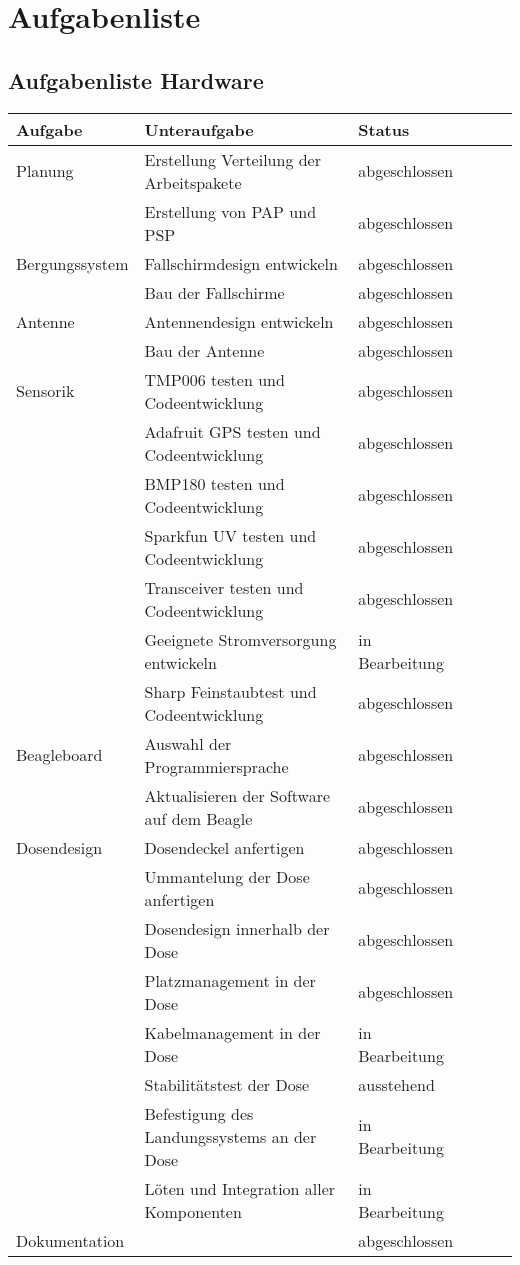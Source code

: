 \section{Aufgabenliste}

\subsection{Aufgabenliste Hardware}
\begin{table}[H]
  \centering
    \begin{tabular}{p{3cm}p{7cm}p{3cm}rrr}
    \toprule
    \textbf{Aufgabe} & \textbf{Unteraufgabe} & \textbf{Status} \\
    \midrule
	Planung & Erstellung Verteilung der Arbeitspakete & abgeschlossen \\
	& Erstellung von PAP und PSP & abgeschlossen \\
	\midrule
	Bergungssystem & Fallschirmdesign entwickeln & abgeschlossen\\
	& Bau der Fallschirme & abgeschlossen\\
	\midrule
	Antenne & Antennendesign entwickeln & abgeschlossen \\
	& Bau der Antenne & abgeschlossen \\
	\midrule
	Sensorik & TMP006 testen und Codeentwicklung & abgeschlossen\\
	& Adafruit GPS testen und Codeentwicklung & abgeschlossen\\
	& BMP180 testen und Codeentwicklung & abgeschlossen\\
	& Sparkfun UV testen und Codeentwicklung & abgeschlossen\\
	& Transceiver testen und Codeentwicklung & abgeschlossen\\
	& Geeignete Stromversorgung entwickeln & in Bearbeitung\\
	& Sharp Feinstaubtest und Codeentwicklung & abgeschlossen\\
	\midrule
	Beagleboard & Auswahl der Programmiersprache & abgeschlossen\\
	& Aktualisieren der Software auf dem Beagle & abgeschlossen\\
	\midrule
	Dosendesign & Dosendeckel anfertigen & abgeschlossen\\
	& Ummantelung der Dose anfertigen & abgeschlossen\\
	& Dosendesign innerhalb der Dose & abgeschlossen\\
	& Platzmanagement in der Dose & abgeschlossen\\
	& Kabelmanagement in der Dose & in Bearbeitung\\
	& Stabilitätstest der Dose & ausstehend\\
	& Befestigung des Landungssystems an der Dose & in Bearbeitung\\
	& Löten und Integration aller Komponenten & in Bearbeitung\\
  \midrule
  Dokumentation & & abgeschlossen \\
  \bottomrule
  \bottomrule
  \end{tabular}%
  \label{tab:aufgabenliste_hardware}%
\end{table}%


